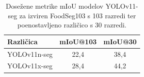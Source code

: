 \documentclass[a4paper,twoside,openright,12pt,slovene]{book}
\begin{document}
            \begin{table}[!htbp]
                \centering
                \begin{tabular}{lcc}
                    \toprule
                    \textbf{Različica} & \textbf{mIoU@103} & \textbf{mIoU@30} \\
                    \midrule
                    YOLOv11n-seg & 22{,}4 & 38{,}4 \\
                    YOLOv11x-seg & 28{,}4 & 44{,}2 \\
                    \bottomrule
                \end{tabular}
                \caption[Rezultati modelov YOLOv11-seg]{Dosežene metrike mIoU modelov YOLOv11-seg za izviren FoodSeg103 s 103 razredi ter poenostavljeno različico s 30 razredi.}
                \label{tab:yolo11-iou-table}
            \end{table}

\end{document}
